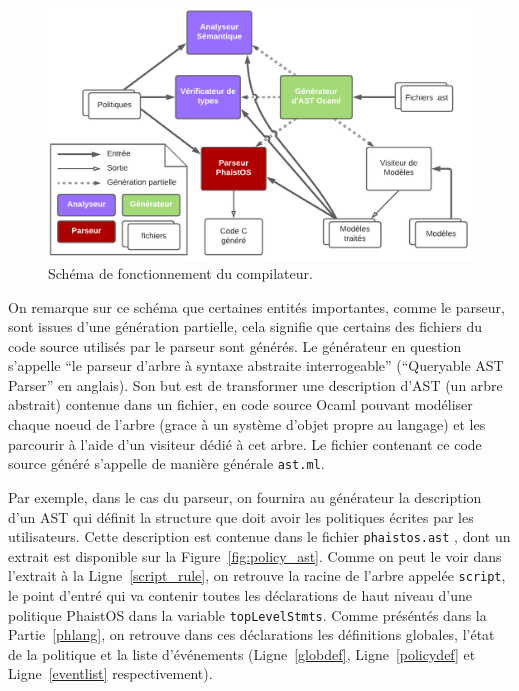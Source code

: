 \begin{figure}[h!t] \centering
    \includegraphics[width=\textwidth]{images/compiler}
    \caption{Schéma de fonctionnement du compilateur.}
    \label{fig:compiler}
\end{figure}

\label{ast_files}

On remarque sur ce schéma que certaines entités importantes, comme le parseur, 
sont issues d'une génération partielle, cela signifie que certains des fichiers 
du code source utilisés par le parseur sont générés. Le générateur en question 
s'appelle ``le parseur d'arbre à syntaxe abstraite interrogeable'' (``Queryable 
AST Parser'' en anglais). Son but est de transformer une description d'AST (un 
arbre abstrait) contenue dans un fichier, en code source Ocaml pouvant 
modéliser chaque noeud de l'arbre (grace à un système d'objet propre au 
langage) et les parcourir à l'aide d'un visiteur dédié à cet arbre. Le fichier 
contenant ce code source généré s'appelle de manière générale \texttt{ast.ml}.

Par exemple, dans le cas du parseur, on fournira au générateur la description 
d'un AST qui définit la structure que doit avoir les politiques écrites par les 
utilisateurs. Cette description est contenue dans le fichier \texttt{phaistos.ast}
, dont un extrait est disponible sur la Figure~\ref{fig:policy_ast}. Comme 
on peut le voir dans l'extrait à la Ligne~\ref{script_rule}, on retrouve la 
racine de l'arbre appelée \texttt{script}, le point d'entré qui va contenir 
toutes les déclarations de haut niveau d'une politique PhaistOS dans la 
variable \texttt{topLevelStmts}. Comme préséntés dans la Partie~\ref{phlang}, 
on retrouve dans ces déclarations les définitions globales, l'état de la 
politique et la liste d'événements (Ligne~\ref{globdef}, Ligne~\ref{policydef} 
et Ligne~\ref{eventlist} respectivement).

